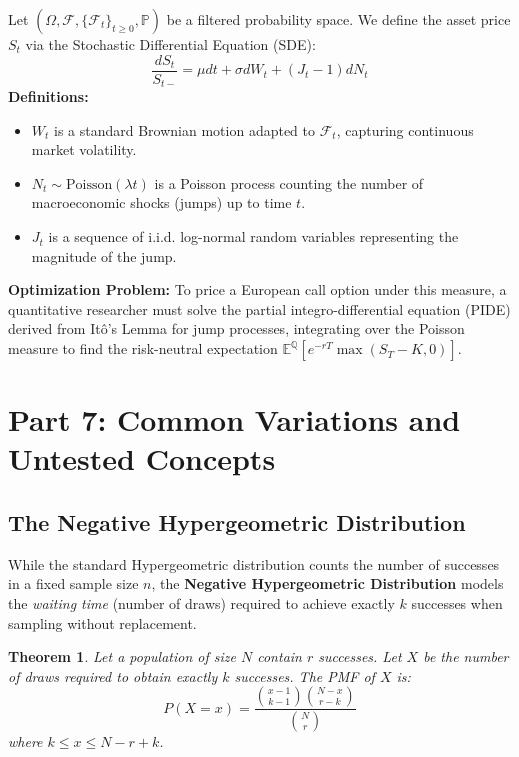 \documentclass[11pt]{article}
\newtheorem{theorem}{Theorem}[section]
\theoremstyle{definition}
\theoremstyle{remark}
\begin{document}
Let $(\Omega, \mathcal{F}, \{\mathcal{F}_t\}_{t \ge 0}, \mathbb{P})$ be a filtered probability space. We define the asset price $S_t$ via the Stochastic Differential Equation (SDE):
\[ \frac{dS_t}{S_{t-}} = \mu dt + \sigma dW_t + (J_t - 1) dN_t \]
\textbf{Definitions:}
\begin{itemize}
    \item $W_t$ is a standard Brownian motion adapted to $\mathcal{F}_t$, capturing continuous market volatility.
    \item $N_t \sim \text{Poisson}(\lambda t)$ is a Poisson process counting the number of macroeconomic shocks (jumps) up to time $t$.
    \item $J_t$ is a sequence of i.i.d. log-normal random variables representing the magnitude of the jump.
\end{itemize}
\textbf{Optimization Problem:} To price a European call option under this measure, a quantitative researcher must solve the partial integro-differential equation (PIDE) derived from It\^{o}'s Lemma for jump processes, integrating over the Poisson measure to find the risk-neutral expectation $\mathbb{E}^{\mathbb{Q}}[e^{-rT}\max(S_T - K, 0)]$.

\newpage
\section{Part 7: Common Variations and Untested Concepts}

\subsection{The Negative Hypergeometric Distribution}
While the standard Hypergeometric distribution counts the number of successes in a fixed sample size $n$, the \textbf{Negative Hypergeometric Distribution} models the \textit{waiting time} (number of draws) required to achieve exactly $k$ successes when sampling without replacement.

\begin{theorem}
Let a population of size $N$ contain $r$ successes. Let $X$ be the number of draws required to obtain exactly $k$ successes. The PMF of $X$ is:
\[ P(X = x) = \frac{\binom{x-1}{k-1} \binom{N-x}{r-k}}{\binom{N}{r}} \]
where $k \le x \le N - r + k$.
\end{theorem}
\end{document}
